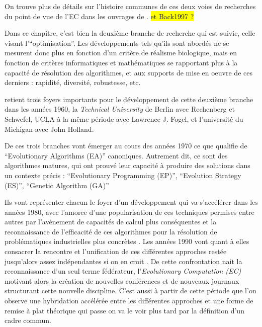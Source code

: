On trouve plus de détails sur l'histoire communes de ces deux voies de recherches du point de vue de l'EC dans les ouvrages de \autocites{DeJong2006a, Fogel1998, Fogel2006a, Fogel2006b}. \hl{ et Back1997 ?} 

Dans ce chapitre, c'est bien la deuxième branche de recherche qui est suivie, celle visant l'\enquote{optimisation}. Les développements tels qu'ils sont abordés ne se mesurent donc plus en fonction d'un critère de réalisme biologique, mais en fonction de critères informatiques et mathématiques se rapportant plus à la capacité de résolution des algorithmes, et aux supports de mise en oeuvre de ces derniers : rapidité, diversité, robustesse, etc.

\textcite{DeJong2006a} retient trois foyers importants pour le développement de cette deuxième branche dans les années 1960, la \textit{Technical University} de Berlin avec Rechenberg et Schwefel, UCLA à la même période avec Lawrence J. Fogel, et l'université du Michigan avec John Holland.

De ces trois branches vont émerger au cours des années 1970 ce que \textcite{DeJong2006a} qualifie de \foreignquote{english}{Evolutionary Algorithms (EA)} canoniques. Autrement dit, ce sont des algorithmes matures, qui ont prouvé leur capacité à produire des solutions dans un contexte précis : \foreignquote{english}{Evolutionary Programming (EP)}, \foreignquote{english}{Evolution Strategy (ES)}, \foreignquote{english}{Genetic Algorithm (GA)}

Ils vont représenter chacun le foyer d'un développement qui va s'accélérer dans les années 1980, avec l'amorce d'une popularisation de ces techniques permises entre autres par l'avènement de capacités de calcul plus conséquentes et la reconnaissance de l'efficacité de ces algorithmes pour la résolution de problématiques industrielles plus concrètes \autocite{Goldberg1989}. Les années 1990 vont quant à elles consacrer la rencontre et l'unification de ces différentes approches restée jusqu'alors assez indépendantes si on en croit \textcite{DeJong2006a}. De cette confrontation nait la reconnaissance d'un seul terme fédérateur, l'\textit{Evolutionary Computation (EC)} motivant alors la création de nouvelles conférences et de nouveaux journaux structurant cette nouvelle discipline. C'est aussi à partir de cette période que l'on observe une hybridation accélérée entre les différentes approches et une forme de remise à plat théorique qui passe on va le voir plus tard par la définition d'un cadre commun. \autocites[23-31]{DeJong2006a}{Back1997}

